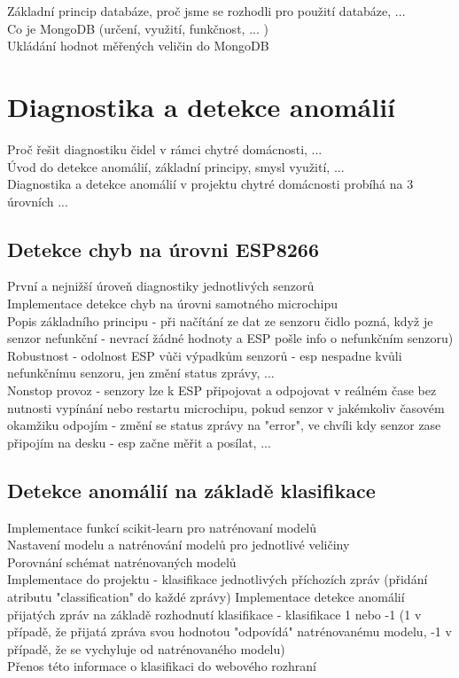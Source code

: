 Základní princip databáze, proč jsme se rozhodli pro použití databáze,  ... \\
Co je MongoDB (určení, využití, funkčnost, ... ) \\
Ukládání hodnot měřených veličin do MongoDB \\

\chapter{Diagnostika a detekce anomálií} \label{chap:methods}

Proč řešit diagnostiku čidel v rámci chytré domácnosti, ... \\
Úvod do detekce anomálií, základní principy, smysl využití, ... \\
Diagnostika a detekce anomálií v projektu chytré domácnosti probíhá na 3 úrovních ... \\

\section{Detekce chyb na úrovni ESP8266} \label{sec:example_xor}

První a nejnižší úroveň diagnostiky jednotlivých senzorů \\
Implementace detekce chyb na úrovni samotného microchipu \\
Popis základního principu - při načítání ze dat ze senzoru čidlo pozná, když je senzor nefunkční - nevrací  žádné hodnoty a ESP pošle info o nefunkčním senzoru) \\
Robustnost - odolnost ESP vůči výpadkům senzorů - esp nespadne kvůli nefunkčnímu senzoru, jen změní status zprávy, ... \\
Nonstop provoz - senzory lze k ESP připojovat a odpojovat v reálném čase bez nutnosti vypínání nebo restartu microchipu, pokud senzor v jakémkoliv časovém okamžiku odpojím - změní se status zprávy na "error", ve chvíli kdy senzor zase připojím na desku - esp začne měřit a posílat, ... \\

\section{Detekce anomálií na základě klasifikace} \label{sec:example_xor}

Implementace funkcí scikit-learn pro natrénovaní modelů \\
Nastavení modelu a natrénování modelů pro jednotlivé veličiny \\
Porovnání schémat natrénovaných modelů \\
Implementace do projektu - klasifikace jednotlivých příchozích zpráv (přidání atributu "classification" do každé zprávy)
Implementace detekce anomálií přijatých zpráv na základě rozhodnutí klasifikace - klasifikace 1 nebo -1 (1 v případě, že přijatá zpráva svou hodnotou "odpovídá" natrénovanému modelu, -1 v případě, že se vychyluje od natrénovaného modelu) \\
Přenos této informace o klasifikaci do webového rozhraní \\

